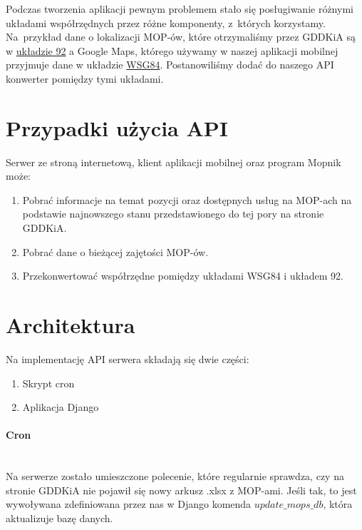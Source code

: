 Podczas tworzenia aplikacji pewnym problemem stało się posługiwanie różnymi układami współrzędnych przez różne komponenty, z~których korzystamy. Na~przykład dane o lokalizacji MOP-ów, które otrzymaliśmy przez GDDKiA są w \href{https://pl.wikipedia.org/wiki/Uk\%C5\%82ad_wsp\%C3\%B3\%C5\%82rz\%C4\%99dnych_1992}{układzie 92} a Google Maps, którego używamy w naszej aplikacji mobilnej przyjmuje dane w układzie \href{https://pl.wikipedia.org/wiki/System_odniesienia_WGS_84}{WSG84}. Postanowiliśmy dodać do naszego API konwerter pomiędzy tymi układami.
\section{Przypadki użycia API}
Serwer ze stroną internetową, klient aplikacji mobilnej oraz program Mopnik może:
\begin{enumerate}
\item Pobrać informacje na temat pozycji oraz dostępnych usług na MOP-ach na podstawie najnowszego stanu przedstawionego do tej pory na stronie GDDKiA.
\item Pobrać dane o bieżącej zajętości MOP-ów.
\item Przekonwertować współrzędne pomiędzy układami WSG84 i układem 92.
\end{enumerate}
\section{Architektura}
Na implementację API serwera składają się dwie części:
\begin{enumerate}
\item Skrypt cron
\item Aplikacja Django
\end{enumerate}
\paragraph{Cron}\mbox{}\\
Na serwerze zostało umieszczone polecenie, które regularnie sprawdza, czy na stronie GDDKiA nie pojawił się nowy arkusz .xlsx z MOP-ami. Jeśli tak, to jest wywoływana zdefiniowana przez nas w Django komenda $\textit{update\_mops\_db}$, która aktualizuje bazę danych.
